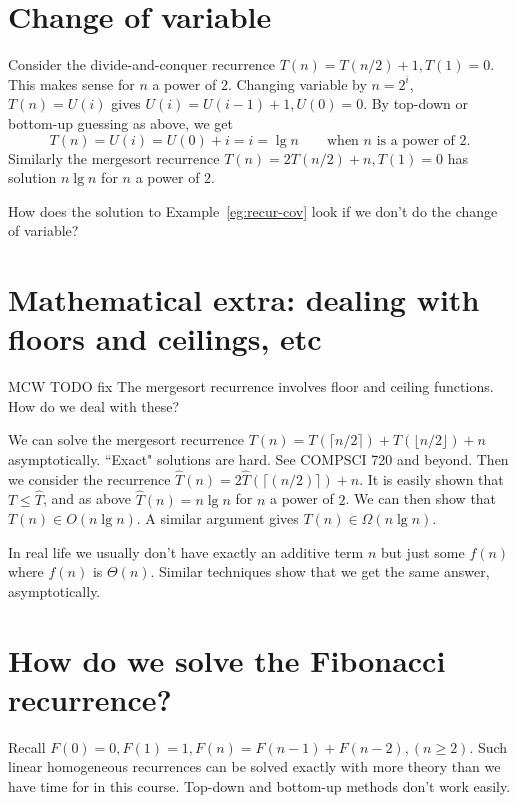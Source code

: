 \section{Change of variable}
\begin{Boxample}
\label{eg:recur-cov}
Consider the divide-and-conquer recurrence $T(n) = T(n/2) + 1, T(1) = 0$. 
This makes sense for $n$ a power of $2$.
Changing variable by $n = 2^i$, $T(n) = U(i)$ 
gives $U(i) = U(i-1) + 1, U(0) = 0$. 
By top-down or bottom-up guessing as above, we get 
$$T(n) = U(i) = U(0) + i = i = \lg n \qquad \text{when } n \text{ is a power of }2\text{.}$$
Similarly the mergesort recurrence $T(n) = 2T(n/2) + n, T(1)  = 0$ 
has solution $n \lg n$ for $n$ a power of $2$.
\end{Boxample}


\begin{Boxample}[6]
How does the solution to Example~\ref{eg:recur-cov} look if we don't do the change of variable?

\end{Boxample}



\section{Mathematical extra: dealing with floors and ceilings, etc}
MCW TODO fix
The mergesort recurrence involves floor and ceiling functions. How do we deal with these?

We can solve the mergesort recurrence $T(n) = T(\lceil n/2 \rceil) + T(\lfloor n/2 \rfloor) + n$ asymptotically. 
``Exact" solutions are hard. See COMPSCI 720 and beyond. Then we consider the recurrence $\hat{T}(n) =
2\hat{T}(\lceil(n/2)\rceil) + n$. It is easily shown that $T \leq \hat{T}$, and 
as above $\hat{T}(n) = n \lg n$ for $n$ a power of $2$. We can then show that $T(n)
\in O(n \lg n)$. A similar argument gives $T(n) \in \Omega(n \lg n)$.

In real life we usually don't have exactly an additive term $n$
but just some $f(n)$ where $f(n)$ is $\Theta(n)$. Similar techniques show that 
we get the same answer, asymptotically. 


\section{How do we solve the Fibonacci recurrence?}

Recall $F(0) = 0, F(1) = 1, F(n) = F(n-1) + F(n-2), (n \geq 2)$.
Such linear homogeneous recurrences can be solved exactly with
more theory than we have time for in this course. Top-down and bottom-up methods 
don't work easily. 

